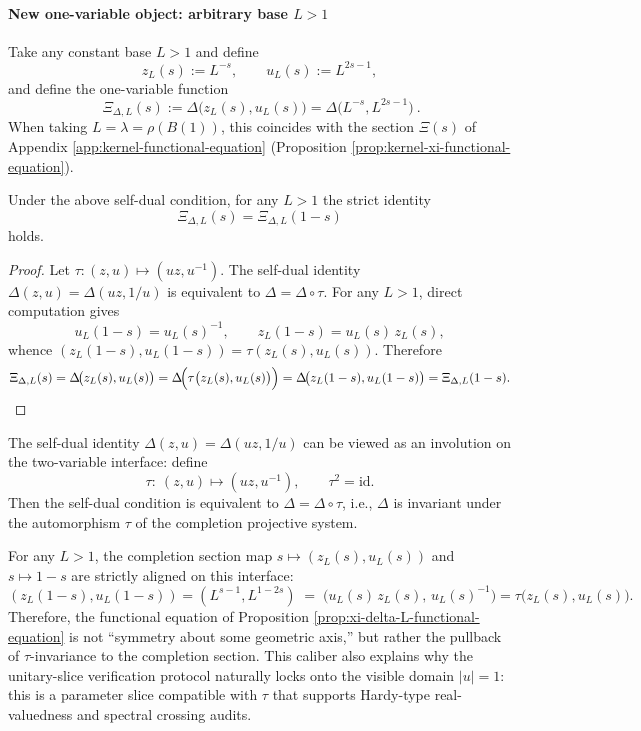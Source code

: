 \paragraph{New one-variable object: arbitrary base \texorpdfstring{$L>1$}{L>1}}
Take any constant base \(L>1\) and define
\[
z_L(s):=L^{-s},\qquad u_L(s):=L^{2s-1},
\]
and define the one-variable function
\[
\boxed{\ \Xi_{\Delta,L}(s):=\Delta\!\bigl(z_L(s),u_L(s)\bigr)=\Delta\!\bigl(L^{-s},L^{2s-1}\bigr)\ }.
\]
When taking \(L=\lambda=\rho(B(1))\), this coincides with the section \(\Xi(s)\) of Appendix \ref{app:kernel-functional-equation} (Proposition \ref{prop:kernel-xi-functional-equation}).

\begin{proposition}\label{prop:xi-delta-L-functional-equation}
Under the above self-dual condition, for any \(L>1\) the strict identity
\[
\boxed{\ \Xi_{\Delta,L}(s)=\Xi_{\Delta,L}(1-s)\ }
\]
holds.
\end{proposition}
\begin{proof}
Let \(\tau:(z,u)\mapsto(uz,u^{-1})\). The self-dual identity \(\Delta(z,u)=\Delta(uz,1/u)\) is equivalent to \(\Delta=\Delta\circ\tau\).
For any \(L>1\), direct computation gives
\[
u_L(1-s)=u_L(s)^{-1},\qquad z_L(1-s)=u_L(s)\,z_L(s),
\]
whence \((z_L(1-s),u_L(1-s))=\tau(z_L(s),u_L(s))\).
Therefore
\[
\Xi_{\Delta,L}(s)
=\Delta\!\bigl(z_L(s),u_L(s)\bigr)
=\Delta\!\Bigl(\tau\bigl(z_L(s),u_L(s)\bigr)\Bigr)
=\Delta\!\bigl(z_L(1-s),u_L(1-s)\bigr)
=\Xi_{\Delta,L}(1-s).
\]
\end{proof}

\begin{remark}\label{rem:xi-projection-system-automorphism}
The self-dual identity \(\Delta(z,u)=\Delta(uz,1/u)\) can be viewed as an involution on the two-variable interface:
define
\[
\tau:\ (z,u)\longmapsto (uz,u^{-1}),
\qquad \tau^2=\mathrm{id}.
\]
Then the self-dual condition is equivalent to \(\Delta=\Delta\circ\tau\), i.e., \(\Delta\) is invariant under the automorphism \(\tau\) of the completion projective system.
\par
For any \(L>1\), the completion section map \(s\mapsto (z_L(s),u_L(s))\) and \(s\mapsto 1-s\) are strictly aligned on this interface:
\[
(z_L(1-s),u_L(1-s))
=(L^{s-1},L^{1-2s})
\;=\;
\bigl(u_L(s)\,z_L(s),\,u_L(s)^{-1}\bigr)
=\tau\bigl(z_L(s),u_L(s)\bigr).
\]
Therefore, the functional equation of Proposition \ref{prop:xi-delta-L-functional-equation} is not ``symmetry about some geometric axis,'' but rather the pullback of \(\tau\)-invariance to the completion section. This caliber also explains why the unitary-slice verification protocol naturally locks onto the visible domain \(|u|=1\): this is a parameter slice compatible with \(\tau\) that supports Hardy-type real-valuedness and spectral crossing audits.
\end{remark}

